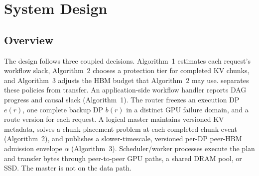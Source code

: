 \section{System Design}
\label{sec:design}






\subsection{Overview}

The design follows three coupled decisions.  Algorithm~1 estimates each
request's workflow slack, Algorithm~2 chooses a protection tier for completed
KV chunks, and Algorithm~3 adjusts the HBM budget that Algorithm~2 may use.
\system{} separates these policies from transfer.  An application-side workflow
handler reports DAG progress and causal slack (Algorithm~1).  The router freezes
an execution DP $e(r)$, one complete backup DP $b(r)$ in a distinct GPU failure
domain, and a route version for each request.  A logical master maintains
versioned KV metadata, solves a
chunk-placement problem at each completed-chunk event (Algorithm~2), and
publishes a slower-timescale, versioned per-DP peer-HBM admission envelope
$\alpha$ (Algorithm~3).
Scheduler/worker processes execute the plan and
transfer bytes through peer-to-peer GPU paths, a shared DRAM pool, or SSD.  The
master is not on the data path.

